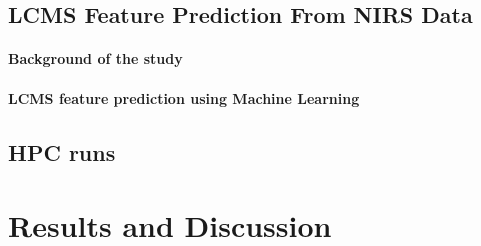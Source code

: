 \documentclass[12pt,a4paper]{report}
\begin{document}
\section{LCMS Feature Prediction From NIRS Data}
\subsubsection*{Background of the study}
\subsubsection*{LCMS feature prediction using Machine Learning}
\section{HPC runs}


\chapter{Results and Discussion}
\end{document}
